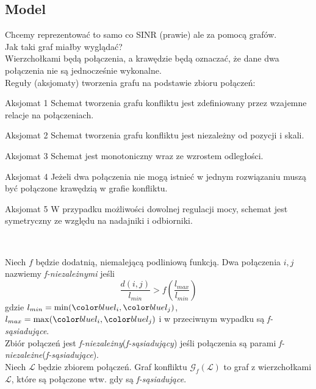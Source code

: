 \documentclass[polish, t,10pt]{beamer}
\begin{document}
\subsection{Model}
    \begin{frame}
        Chcemy reprezentować to samo co SINR (prawie) ale za pomocą grafów. \\
        Jak taki graf miałby wyglądać? \\
        \pause
        Wierzchołkami będą połączenia, a krawędzie będą oznaczać, że dane dwa połączenia nie są jednocześnie wykonalne. \\
        \pause
        Reguły (aksjomaty) tworzenia grafu na podstawie zbioru połączeń: \\
        \begin{block}{Aksjomat 1}
            Schemat tworzenia grafu konfliktu jest zdefiniowany przez wzajemne relacje na połączeniach.
        \end{block}

        \pause
        \begin{block}{Aksjomat 2}
            Schemat tworzenia grafu konfliktu jest niezależny od pozycji i skali.
        \end{block}

        \pause
        \begin{block}{Aksjomat 3}
            Schemat jest monotoniczny wraz ze wzrostem odległości.
        \end{block}

        \pause
        \begin{block}{Aksjomat 4}
            Jeżeli dwa połączenia nie mogą istnieć w jednym rozwiązaniu muszą być połączone krawędzią w grafie konfliktu.
        \end{block}
    \end{frame}
    \begin{frame}
        \begin{block}{Aksjomat 5}
            W przypadku możliwości dowolnej regulacji mocy, schemat jest symetryczny ze względu na nadajniki i odbiorniki.
        \end{block}
        \pause
        ~\\
        \begin{definition}
            Niech $f$ będzie dodatnią, niemalejącą podliniową funkcją. Dwa połączenia $i,j$ nazwiemy \textit{f-niezależnymi} jeśli
            $$
            \frac{d(i,j)}{l_{min}} > f(\frac{l_{max}}{l_{min}})
            $$
            gdzie $l_{min} = \min(\li,\lj)$, $l_{max} = \max(\li,\lj)$ i w przeciwnym wypadku są \textit{f-sąsiadujące}. \\
            Zbiór połączeń jest \textit{f-niezależny}(\textit{f-sąsiadujący}) jeśli połączenia są parami \textit{f-niezależne}(\textit{f-sąsiadujące}). \\
            Niech $\mathcal{L}$ będzie zbiorem połączeń. Graf konfliktu $\mathcal{G}_f(\mathcal{L})$ to graf z wierzchołkami $\mathcal{L}$, które są połączone wtw. gdy są \textit{f-sąsiadujące}.
        \end{definition}
    \end{frame}
\end{document}
